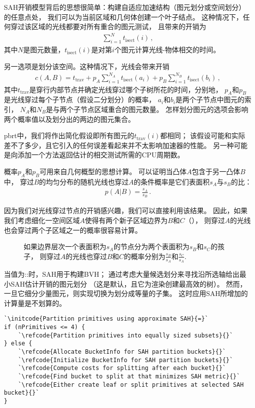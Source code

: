SAH开销模型背后的思想很简单：构建自适应加速结构（图元划分或空间划分）的任意点处，
我们可以为当前区域和几何体创建一个叶子结点。
这种情况下，任何穿过该区域的光线都要对所有重合的图元测试，
且带来的开销为
\begin{align*}
    \sum\limits_{i=1}^{N}{t_{\mathrm{isect}}(i)}\, ,
\end{align*}
其中$N$是图元数量，$t_{\mathrm{isect}}(i)$是对第$i$个图元计算光线-物体相交的时间。

另一选项是划分该空间。这种情况下，光线会带来开销
\begin{align}\label{eq:4.1}
    c(A,B)=t_{\mathrm{trav}}+p_A\sum\limits_{i=1}^{N_A}{t_\mathrm{isect}(a_i)}+p_B\sum\limits_{i=1}^{N_B}{t_{\mathrm{isect}}(b_i)}\, ,
\end{align}
其中$t_{\mathrm{trav}}$是穿行内部节点并确定光线穿过哪个子树所花的时间，分别地，
$p_A$和$p_B$是光线穿过每个子节点（假设二分划分）的概率，
$a_i$和$b_i$是两个子节点中图元的索引，
$N_A$和$N_B$是与两个子节点区域重合的图元数量。
怎样划分图元的选项会影响两个概率值以及划分出的两边的图元集合。

pbrt中，我们将作出简化假设即所有图元的$t_{\mathrm{trav}}(i)$都相同；
该假设可能和实际差不了多少，且它引入的任何误差看起来并不太影响加速器的性能。
另一种可能是向添加一个方法返回估计的相交测试所需的CPU周期数。

概率$p_A$和$p_B$可用来自几何概型的思想计算。
可以证明当凸体$A$包含于另一凸体$B$中，
穿过$B$的均匀分布的随机光线也穿过$A$的条件概率是它们表面积$s_A$与$s_B$的比：
\begin{align*}
    \displaystyle p(A|B)=\frac{s_A}{s_B}\, .
\end{align*}

因为我们对光线穿过节点的开销感兴趣，我们可以直接利用该结果。
因此，如果我们考虑细化一空间区域$A$使得有两个新子区域边界为$B$和$C$（），
则穿过$A$的光线也会穿过两个子区域之一的概率很容易计算。
\begin{figure}[htbp]
    \centering
    \caption{如果边界层次一个表面积为$s_A$的节点分为两个表面积为$s_B$和$s_C$的孩子，
        则穿过$A$的光线也穿过$B$和$C$的概率分别为$\displaystyle\frac{s_B}{s_A}$和$\displaystyle\frac{s_C}{s_A}$.}
    \label{fig:4.5}
\end{figure}

当值为{\ttfamily{}::}时，SAH用于构建BVH；
通过考虑大量候选划分来寻找沿所选轴给出最小SAH估计开销的图元划分
（这是默认，且它为渲染创建最高效的树）。
然而，一旦它细分少量图元，则实现切换为划分成等量的子集。
这时应用SAH所增加的计算量是不划算的。
\begin{lstlisting}
`\initcode{Partition primitives using approximate SAH}{=}`
if (nPrimitives <= 4) {
    `\refcode{Partition primitives into equally sized subsets}{}`
} else {
    `\refcode{Allocate BucketInfo for SAH partition buckets}{}`
    `\refcode{Initialize BucketInfo for SAH partition buckets}{}`
    `\refcode{Compute costs for splitting after each bucket}{}`
    `\refcode{Find bucket to split at that minimizes SAH metric}{}`
    `\refcode{Either create leaf or split primitives at selected SAH bucket}{}`
}
\end{lstlisting}

